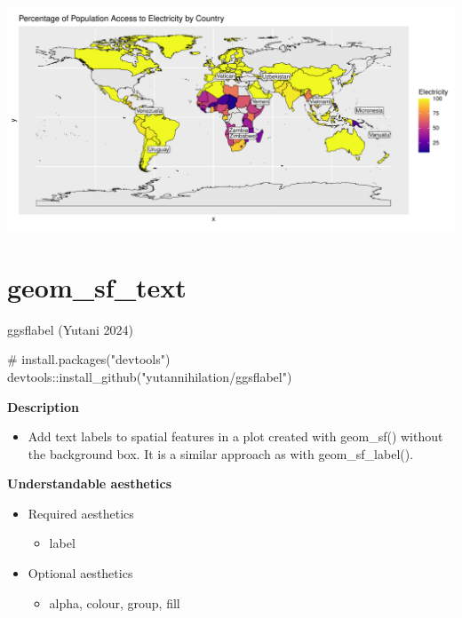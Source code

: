 \documentclass[
  letterpaper,
  DIV=11,
  numbers=noendperiod]{scrreprt}
\newenvironment{Shaded}{\begin{snugshade}}{\end{snugshade}}
\newcommand{\CommentTok}[1]{\textcolor[rgb]{0.37,0.37,0.37}{#1}}
\newcommand{\FunctionTok}[1]{\textcolor[rgb]{0.28,0.35,0.67}{#1}}
\newcommand{\NormalTok}[1]{\textcolor[rgb]{0.00,0.23,0.31}{#1}}
\newcommand{\SpecialCharTok}[1]{\textcolor[rgb]{0.37,0.37,0.37}{#1}}
\newcommand{\StringTok}[1]{\textcolor[rgb]{0.13,0.47,0.30}{#1}}
\providecommand{\tightlist}{%
  \setlength{\itemsep}{0pt}\setlength{\parskip}{0pt}}\usepackage{longtable,booktabs,array}
\begin{document}
\includegraphics{s_files/figure-pdf/unnamed-chunk-10-1.pdf}

\section{geom\_sf\_text}\label{geom_sf_text}

ggsflabel (Yutani 2024)

\begin{Shaded}
\begin{Highlighting}[]
\CommentTok{\# install.packages("devtools")}
\NormalTok{devtools}\SpecialCharTok{::}\FunctionTok{install\_github}\NormalTok{(}\StringTok{"yutannihilation/ggsflabel"}\NormalTok{)}
\end{Highlighting}
\end{Shaded}

\textbf{Description}

\begin{itemize}
\tightlist
\item
  Add text labels to spatial features in a plot created with geom\_sf()
  without the background box. It is a similar approach as with
  geom\_sf\_label().
\end{itemize}

\textbf{Understandable aesthetics}

\begin{itemize}
\tightlist
\item
  Required aesthetics

  \begin{itemize}
  \tightlist
  \item
    label
  \end{itemize}
\item
  Optional aesthetics

  \begin{itemize}
  \tightlist
  \item
    alpha, colour, group, fill
  \end{itemize}
\end{itemize}
\end{document}
